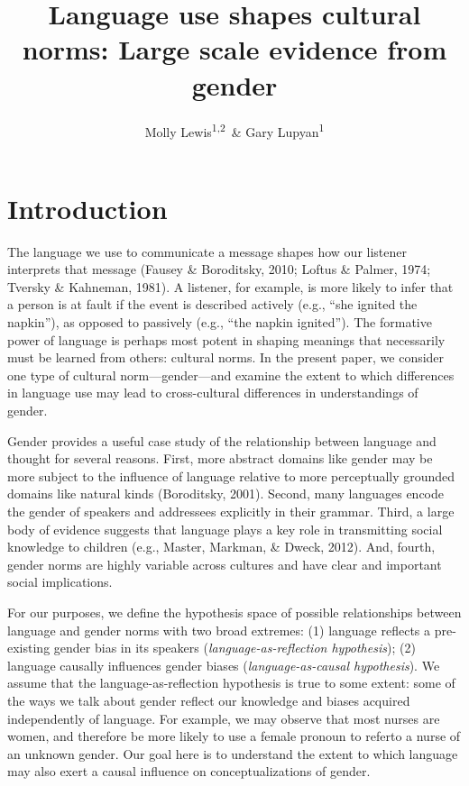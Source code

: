 \documentclass[man,floatsintext]{apa6}
\title{Language use shapes cultural norms: Large scale evidence from gender}
\author{Molly Lewis\textsuperscript{1,2}~\& Gary Lupyan\textsuperscript{1}}
\date{}
\affiliation{
\vspace{0.5cm}
\textsuperscript{1} University of Wisconsin-Madison\\\textsuperscript{2} University of Chicago}
\theoremstyle{definition}
\theoremstyle{definition}
\theoremstyle{definition}
\theoremstyle{remark}
\begin{document}
\maketitle

\section{Introduction}\label{introduction}

The language we use to communicate a message shapes how our listener
interprets that message (Fausey \& Boroditsky, 2010; Loftus \& Palmer,
1974; Tversky \& Kahneman, 1981). A listener, for example, is more
likely to infer that a person is at fault if the event is described
actively (e.g., \enquote{she ignited the napkin}), as opposed to
passively (e.g., \enquote{the napkin ignited}). The formative power of
language is perhaps most potent in shaping meanings that necessarily
must be learned from others: cultural norms. In the present paper, we
consider one type of cultural norm---gender---and examine the extent to
which differences in language use may lead to cross-cultural differences
in understandings of gender.

Gender provides a useful case study of the relationship between language
and thought for several reasons. First, more abstract domains like
gender may be more subject to the influence of language relative to more
perceptually grounded domains like natural kinds (Boroditsky, 2001).
Second, many languages encode the gender of speakers and addressees
explicitly in their grammar. Third, a large body of evidence suggests
that language plays a key role in transmitting social knowledge to
children (e.g., Master, Markman, \& Dweck, 2012). And, fourth, gender
norms are highly variable across cultures and have clear and important
social implications.

For our purposes, we define the hypothesis space of possible
relationships between language and gender norms with two broad extremes:
(1) language reflects a pre-existing gender bias in its speakers
(\emph{language-as-reflection hypothesis}); (2) language causally
influences gender biases (\emph{language-as-causal hypothesis}). We
assume that the language-as-reflection hypothesis is true to some
extent: some of the ways we talk about gender reflect our knowledge and
biases acquired independently of language. For example, we may observe
that most nurses are women, and therefore be more likely to use a female
pronoun to referto a nurse of an unknown gender. Our goal here is to
understand the extent to which language may also exert a causal
influence on conceptualizations of gender.
\end{document}
